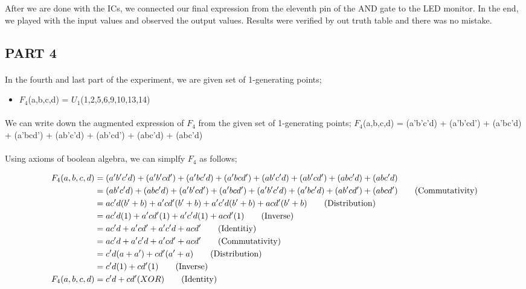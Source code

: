 \documentclass[pdftex,12pt,a4paper]{article}
\begin{document}
After we are done with the ICs, we connected our final expression from the eleventh pin of the AND gate to the LED monitor. In the end, we played with the input values and observed the output values. Results were verified by out truth table and there was no mistake.

\clearpage



\subsection{PART 4}

\paragraph{}
In the fourth and last part of the experiment, we are given set of 1-generating points;

\begin{itemize}
    \item $F_{4}$(a,b,c,d) = $U_{1}$(1,2,5,6,9,10,13,14)  
\end{itemize}

\paragraph{}
We can write down the augmented expression of $F_{4}$ from the given set of 1-generating points;\newline \newline
$F_{4}$(a,b,c,d) = (a'b'c'd) + (a'b'cd') + (a'bc'd) + (a'bcd') + (ab'c'd) + (ab'cd') + (abc'd) + (abc'd)

\paragraph{}
Using axioms of boolean algebra, we can simplfy $F_{4}$ as follows;

\begin{align}
F_{4}(a,b,c,d) &= (a'b'c'd) + (a'b'cd') + (a'bc'd) + (a'bcd') + (ab'c'd) + (ab'cd') + (abc'd) + (abc'd) \notag\\ 
&= (a b' c' d) + (abc'd) + (a'b'cd') + (a'bcd') + (a'   b'   c'   d) + (a'   b   c'   d) + (a   b'   c   d') + (a   b   c   d') \tag{Commutativity} \\
&= ac'd(b' + b) + a'cd'(b'+b) + a'c'd(b' + b) + acd'(b'+b) \tag{Distribution} \\
&= ac'd(1) + a'cd'(1) + a'c'd(1) + acd'(1) \tag{Inverse} \\
&= ac'd + a'cd'+ a'c'd+ acd' \tag{Identitiy} \\
&= ac'd + a'c'd + a'cd' + acd' \tag{Commutativity} \\
&= c'd(a + a') + cd'(a' + a) \tag{Distribution} \\
&= c'd(1) + cd'(1) \tag{Inverse} \\
F_{4}(a,b,c,d) &= c'd + cd'(XOR) \tag{Identity} \\
\notag \end{align}
\end{document}
